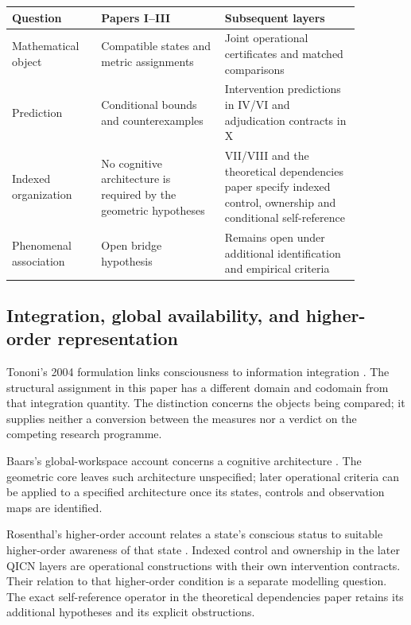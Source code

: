 \documentclass[11pt,a4paper]{article}
\theoremstyle{plain}
\theoremstyle{definition}
\theoremstyle{remark}
\begin{document}
\begin{center}\small
\begin{tabular}{|p{0.22\linewidth}|p{0.31\linewidth}|p{0.34\linewidth}|}
\hline
Question & Papers I--III & Subsequent layers \\ \hline
Mathematical object & Compatible states and metric assignments & Joint operational certificates and matched comparisons \\
Prediction & Conditional bounds and counterexamples & Intervention predictions in IV/VI and adjudication contracts in X \\
Indexed organization & No cognitive architecture is required by the geometric hypotheses & VII/VIII and the theoretical dependencies paper specify indexed control, ownership and conditional self-reference \\
Phenomenal association & Open bridge hypothesis & Remains open under additional identification and empirical criteria \\ \hline
\end{tabular}
\end{center}

\subsection{Integration, global availability, and higher-order representation}
Tononi's 2004 formulation links consciousness to information integration
\cite{tononi2004}. The structural assignment in this paper has a different
domain and codomain from that integration quantity. The distinction concerns
the objects being compared; it supplies neither a conversion between the
measures nor a verdict on the competing research programme.

Baars's global-workspace account concerns a cognitive architecture
\cite{baars1988}. The geometric core leaves such architecture unspecified;
later operational criteria can be applied to a specified architecture once
its states, controls and observation maps are identified.

Rosenthal's higher-order account relates a state's conscious status to suitable
higher-order awareness of that state \cite{rosenthal1986}. Indexed control
and ownership in the later QICN layers are operational constructions with
their own intervention contracts. Their relation to that higher-order
condition is a separate modelling question. The exact self-reference
operator in the theoretical dependencies paper retains its additional
hypotheses and its explicit obstructions.
\end{document}
